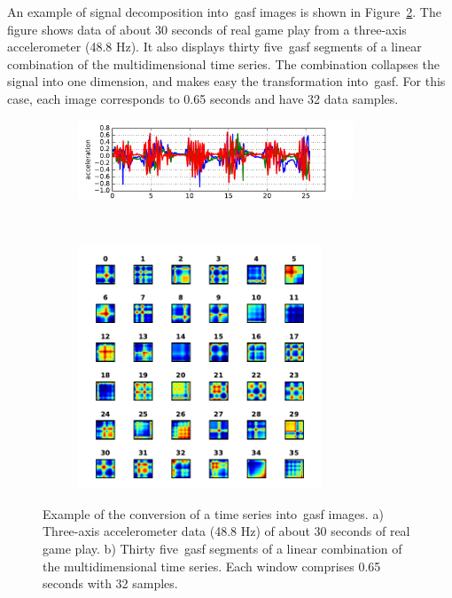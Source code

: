 An example of signal decomposition into~\gls{gasf} images is shown in Figure~\ref{fig:acc_signal_gasfs}. The figure shows data of about 30 seconds of real game play from a three-axis accelerometer (48.8 Hz). It also displays thirty five~\gls{gasf} segments of a linear combination of the multidimensional time series. The combination collapses the signal into one dimension, and makes easy the transformation into~\gls{gasf}. For this case, each image corresponds to 0.65 seconds and have 32 data samples.

\begin{figure}[H]
    \centering
    \begin{subfigure}[h]{\textwidth}
        \centering
        \includegraphics[width=0.9\textwidth]{images/05-modeling/example_signal}
        \label{figure:accelerometer_signal}
        \caption{}
    \end{subfigure} \vspace{-6pt}
    ~
    \begin{subfigure}[h]{0.8\textwidth}
        \centering
        \includegraphics[width=0.8\textwidth]{images/05-modeling/example_gafs_seg}
        \caption{}
    \end{subfigure} \vspace{-6pt}
    \caption{Example of the conversion of a time series into~\gls{gasf} images. a) Three-axis accelerometer data (48.8 Hz) of about 30 seconds of real game play. b) Thirty five~\gls{gasf} segments of a linear combination of the multidimensional time series. Each window comprises 0.65 seconds with 32 samples.}
    \label{fig:acc_signal_gasfs}
\end{figure}

